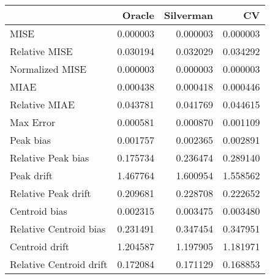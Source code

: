 \begin{tabular}{lrrr}
  \hline
 & Oracle & Silverman & CV \\ 
  \hline
MISE & 0.000003 & 0.000003 & 0.000003 \\ 
  Relative MISE & 0.030194 & 0.032029 & 0.034292 \\ 
  Normalized MISE & 0.000003 & 0.000003 & 0.000003 \\ 
  MIAE & 0.000438 & 0.000418 & 0.000446 \\ 
  Relative MIAE & 0.043781 & 0.041769 & 0.044615 \\ 
  Max Error & 0.000581 & 0.000870 & 0.001109 \\ 
  Peak bias & 0.001757 & 0.002365 & 0.002891 \\ 
  Relative Peak bias & 0.175734 & 0.236474 & 0.289140 \\ 
  Peak drift & 1.467764 & 1.600954 & 1.558562 \\ 
  Relative Peak drift & 0.209681 & 0.228708 & 0.222652 \\ 
  Centroid bias & 0.002315 & 0.003475 & 0.003480 \\ 
  Relative Centroid bias & 0.231491 & 0.347454 & 0.347951 \\ 
  Centroid drift & 1.204587 & 1.197905 & 1.181971 \\ 
  Relative Centroid drift & 0.172084 & 0.171129 & 0.168853 \\ 
   \hline
\end{tabular}

